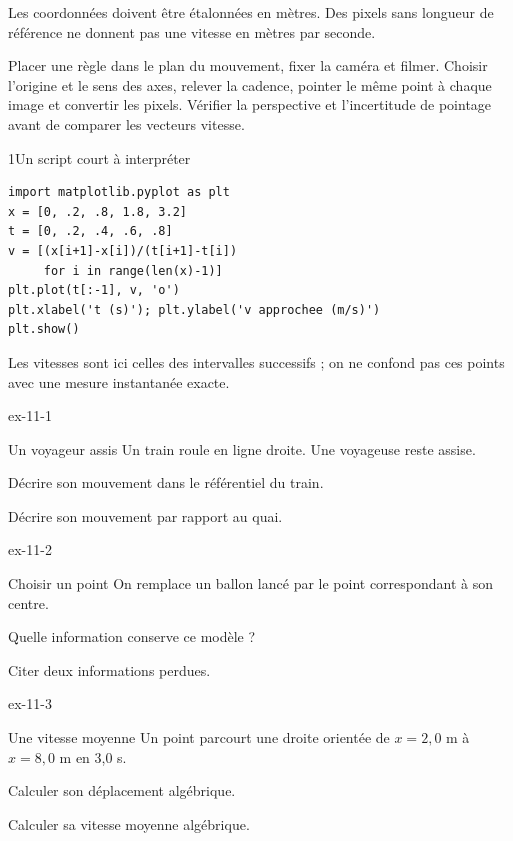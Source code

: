 Les coordonnées doivent être étalonnées en mètres. Des pixels sans longueur de référence ne donnent pas une vitesse en mètres par seconde.
\begin{experience}Placer une règle dans le plan du mouvement, fixer la caméra et filmer. Choisir l'origine et le sens des axes, relever la cadence, pointer le même point à chaque image et convertir les pixels. Vérifier la perspective et l'incertitude de pointage avant de comparer les vecteurs vitesse.\end{experience}
\begin{docu}{1}{Un script court à interpréter}
\begin{verbatim}
import matplotlib.pyplot as plt
x = [0, .2, .8, 1.8, 3.2]
t = [0, .2, .4, .6, .8]
v = [(x[i+1]-x[i])/(t[i+1]-t[i])
     for i in range(len(x)-1)]
plt.plot(t[:-1], v, 'o')
plt.xlabel('t (s)'); plt.ylabel('v approchee (m/s)')
plt.show()
\end{verbatim}
Les vitesses sont ici celles des intervalles successifs ; on ne confond pas ces points avec une mesure instantanée exacte.
\end{docu}
\exercices
{}
\begin{blocLivre}{ex-11-1}\begin{exercice}[1]{Un voyageur assis}
Un train roule en ligne droite. Une voyageuse reste assise.
\begin{questions}
\item Décrire son mouvement dans le référentiel du train.
\item Décrire son mouvement par rapport au quai.
\end{questions}
\end{exercice}\end{blocLivre}
\begin{blocLivre}{ex-11-2}\begin{exercice}[1]{Choisir un point}
On remplace un ballon lancé par le point correspondant à son centre.
\begin{questions}
\item Quelle information conserve ce modèle ?
\item Citer deux informations perdues.
\end{questions}
\end{exercice}\end{blocLivre}
\begin{blocLivre}{ex-11-3}\begin{exercice}[1]{Une vitesse moyenne}
Un point parcourt une droite orientée de $x=2,0$ m à $x=8,0$ m en 3,0 s.
\begin{questions}
\item Calculer son déplacement algébrique.
\item Calculer sa vitesse moyenne algébrique.
\end{questions}
\end{exercice}\end{blocLivre}
